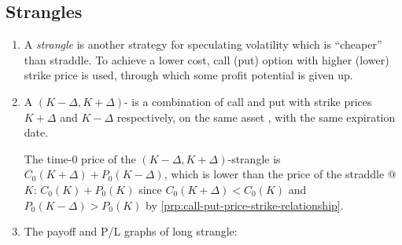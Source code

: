 \subsection{Strangles}
\label{subsect:strangles}
\begin{enumerate}
\item A \emph{strangle} is another strategy for speculating volatility which is
``cheaper'' than straddle. To achieve a lower cost, call (put) option with
higher (lower) strike price is used, through which some profit potential is
given up.

\item A \((K-\Delta,K+\Delta)\)- is a combination of call and
put with strike prices \(K+\Delta\) and \(K-\Delta\) respectively, on the same
asset , with the same expiration date.

\begin{note}
The time-0 price of the \((K-\Delta,K+\Delta)\)-strangle is
\(C_0(K+\Delta)+P_0(K-\Delta)\), which is lower than the price of the straddle
@ \(K\): \(C_0(K)+P_0(K)\) since \(C_0(K+\Delta)<C_0(K)\) and
\(P_0(K-\Delta)>P_0(K)\) by \cref{prp:call-put-price-strike-relationship}.
\end{note}
\item The payoff and P/L graphs of long strangle:
\begin{center}


\end{center}
\end{enumerate}
